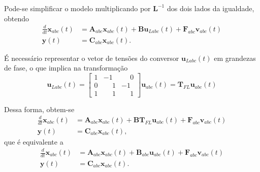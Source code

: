     Pode-se simplificar o modelo multiplicando por $\mathbf{L}^{-1}$ dos dois lados da igualdade, obtendo
    \begin{equation}
        \begin{split}
            \frac{d}{dt} \mathbf{x}_{abc}(t) & = \mathbf{A}_{abc} \mathbf{x}_{abc}(t) +
                \mathbf{Bu}_{Labc}(t) + \mathbf{F}_{abc} \mathbf{v}_{abc}(t) \\
            \mathbf{y}(t) & = \mathbf{C}_{abc} \mathbf{x}_{abc}(t) \text{.}
        \end{split}
    \end{equation}

    É necessário representar o vetor de tensões do conversor $\mathbf{u}_{Labc}(t)$ em grandezas de fase, o que implica na transformação
    \begin{equation}
        \mathbf{u}_{Labc}(t) = \left[
            \begin{array}{ccc}
                1 &           -1 & \phantom{-}0 \\[0.3em]
                0 & \phantom{-}1 &           -1 \\[0.3em]
                1 & \phantom{-}1 & \phantom{-}1
            \end{array}
        \right] \mathbf{u}_{abc}(t) = \mathbf{T}_{FL} \mathbf{u}_{abc}(t)
    \end{equation}

    Dessa forma, obtem-se
    \begin{equation}
        \begin{split}
            \frac{d}{dt} \mathbf{x}_{abc}(t) & = \mathbf{A}_{abc} \mathbf{x}_{abc}(t) +
                \mathbf{BT}_{FL} \mathbf{u}_{abc}(t) + \mathbf{F}_{abc} \mathbf{v}_{abc}(t) \\
            \mathbf{y}(t) & = \mathbf{C}_{abc} \mathbf{x}_{abc}(t) \text{,}
        \end{split}
    \end{equation}
    que é equivalente a
    \begin{equation}
        \begin{split}
            \frac{d}{dt} \mathbf{x}_{abc}(t) & = \mathbf{A}_{abc} \mathbf{x}_{abc}(t) +
                \mathbf{B}_{abc} \mathbf{u}_{abc}(t) + \mathbf{F}_{abc} \mathbf{v}_{abc}(t) \\
            \mathbf{y}(t) & = \mathbf{C}_{abc} \mathbf{x}_{abc}(t) \text{.}
        \end{split}
        \label{eq:LCL_abc_espaco_estados}
    \end{equation}

